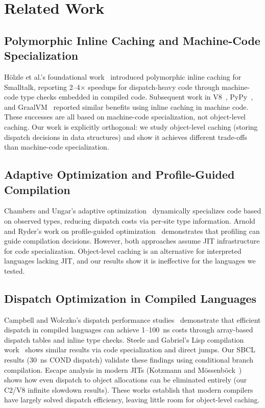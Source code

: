 \documentclass[sigplan,final,acmsmall,review,screen]{acmart}
\begin{document}
\section{Related Work}

\subsection{Polymorphic Inline Caching and Machine-Code Specialization}

Hölzle et al.'s foundational work~\cite{hoelzle1991optimizing} introduced polymorphic inline
caching for Smalltalk, reporting 2--4× speedups for dispatch-heavy code through machine-code type checks embedded in compiled code.
Subsequent work in V8~\cite{bak2010v8}, PyPy~\cite{pypy2}, and GraalVM~\cite{graalvm} reported similar benefits using inline caching in machine code.
These successes are all based on machine-code specialization, not object-level caching. Our work is explicitly orthogonal:
we study object-level caching (storing dispatch decisions in data structures) and show it achieves different trade-offs than machine-code specialization.

\subsection{Adaptive Optimization and Profile-Guided Compilation}

Chambers and Ungar's adaptive optimization~\cite{chambers1989optimizing} dynamically specializes code based on observed types,
reducing dispatch costs via per-site type information. Arnold and Ryder's work on profile-guided optimization~\cite{arnold2005feedback} demonstrates
that profiling can guide compilation decisions. However, both approaches assume JIT infrastructure for code specialization.
Object-level caching is an alternative for interpreted languages lacking JIT, and our results show it is ineffective for the languages we tested.

\subsection{Dispatch Optimization in Compiled Languages}

Campbell and Wolczko's dispatch performance studies~\cite{campbell1992array} demonstrate that efficient dispatch in compiled languages can achieve 1--100~ns costs through array-based dispatch tables and inline type checks. Steele and Gabriel's Lisp compilation work~\cite{steele1990lisp} shows similar results via code specialization and direct jumps. Our SBCL results (30~ns COND dispatch) validate these findings using conditional branch compilation. Escape analysis in modern JITs (Kotzmann and Mössenböck~\cite{kotzmann2005escape}) shows how even dispatch to object allocations can be eliminated entirely
(our C2/V8 infinite slowdown results). These works establish that modern compilers have largely solved dispatch efficiency,
leaving little room for object-level caching.
\end{document}
